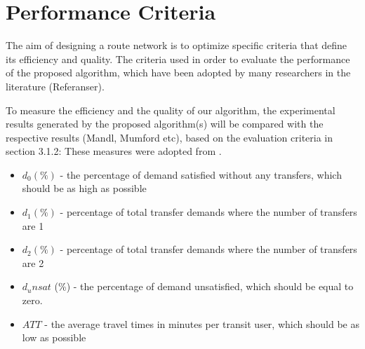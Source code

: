 \section{Performance Criteria}

The aim of designing a route network is to optimize specific criteria that define its efficiency and quality.
The criteria used in order to evaluate the performance of the proposed algorithm, which have been adopted by many researchers in the literature (Referanser).

To measure the efficiency and the quality of our algorithm, the experimental results generated by the proposed algorithm(s) will be compared with the respective results (Mandl, Mumford etc), based on the evaluation criteria in section 3.1.2: 
These measures were adopted from \citet{kechagiopoulos14}.

\begin{itemize}
\item $d_0 (\%)$ - the percentage of demand satisfied without any transfers, which should be as high as possible
\item $d_1 (\%)$ - percentage of total transfer demands where the number of transfers are 1
\item $d_2 (\%)$ - percentage of total transfer demands where the number of transfers are 2
\item $d_unsat$ (\%) - the percentage of demand unsatisfied, which should be equal to zero.
\item $ATT$  - the average travel times in minutes per transit user, which should be as low as possible
\end{itemize}




